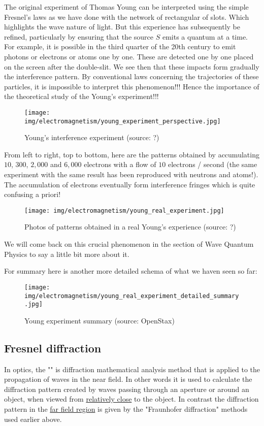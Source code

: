 	The original experiment of Thomas Young can be interpreted using the simple Fresnel's laws as we have done with the network of rectangular of slots. Which highlights the wave nature of light. But this experience has subsequently be refined, particularly by ensuring that the source $S$ emits a quantum at a time. For example, it is possible in the third quarter of the 20th century to emit photons or electrons or atoms one by one. These are detected one by one placed on the screen after the double-slit. We see then that these impacts form gradually the interference pattern. By conventional laws concerning the trajectories of these particles, it is impossible to interpret this phenomenon!!! Hence the importance of the theoretical study of the Young's experiment!!!
	\begin{figure}[H]
		\centering
		\texttt{[image: img/electromagnetism/young\_experiment\_perspective.jpg]}
		\caption[Young's interference experiment]{Young's interference experiment (source: ?)}
	\end{figure}
	From left to right, top to bottom, here are the patterns obtained by accumulating $10$, $300$, $2,000$ and $6,000$ electrons with a flow of $10$ electrons / second (the same experiment with the same result has been reproduced with neutrons and atoms!). The accumulation of electrons eventually form interference fringes which is quite confusing a priori!
	\begin{figure}[H]
		\centering
		\texttt{[image: img/electromagnetism/young\_real\_experiment.jpg]}
		\caption[Photos of patterns obtained in a real Young's experience]{Photos of patterns obtained in a real Young's experience (source: ?)}
	\end{figure}
	We will come back on this crucial phenomenon in the section of Wave Quantum Physics to say a little bit more about it.
	
	For summary here is another more detailed schema of what we haven seen so far:
	\begin{figure}[H]
		\centering
		\texttt{[image: img/electromagnetism/young\_real\_experiment\_detailed\_summary.jpg]}	
		\caption[Young experiment summary]{Young experiment summary (source: OpenStax)}
	\end{figure}
	
	\pagebreak
	\subsection{Fresnel diffraction}
	In optics, the "" is diffraction mathematical analysis method that is applied to the propagation of waves in the near field. In other words it is used to calculate the diffraction pattern created by waves passing through an aperture or around an object, when viewed from \underline{relatively close} to the object. In contrast the diffraction pattern in the \underline{far field region} is given by the "Fraunhofer diffraction" methods used earlier above.
	
